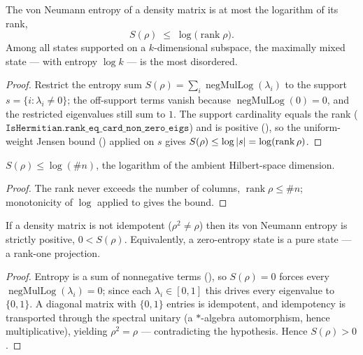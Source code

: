 \begin{theorem}\label{vonNeumannEntropy_le_log_rank}
  \leanok
  The von Neumann entropy of a density matrix is at most the logarithm of its rank,
  \[
    S(\rho) \;\le\; \log\bigl(\operatorname{rank}\rho\bigr).
  \]
  Among all states supported on a \(k\)-dimensional subspace, the maximally mixed state --- with
  entropy \(\log k\) --- is the most disordered.
\end{theorem}
\begin{proof}\leanok
  Restrict the entropy sum \(S(\rho) = \sum_i\operatorname{negMulLog}(\lambda_i)\) to the support
  \(s = \{i : \lambda_i\ne 0\}\); the off-support terms vanish because
  \(\operatorname{negMulLog}(0) = 0\), and the restricted eigenvalues still sum to \(1\). The support
  cardinality equals the rank (\(\texttt{IsHermitian.rank\_eq\_card\_non\_zero\_eigs}\)) and is
  positive (), so the uniform-weight Jensen bound
  () applied on \(s\) gives
  \(S(\rho)\le\log\left\lvert s \right\rvert = \log(\operatorname{rank}\rho)\).
\end{proof}

\begin{corollary}\label{vonNeumannEntropy_le_log_card}
  \leanok
  \(S(\rho)\le\log(\#n)\), the logarithm of the ambient Hilbert-space dimension.
\end{corollary}
\begin{proof}\leanok
  The rank never exceeds the number of columns, \(\operatorname{rank}\rho\le\#n\); monotonicity of
  \(\log\) applied to  gives the bound.
\end{proof}

\begin{theorem}\label{vonNeumannEntropy_pos_of_sq_ne}
  \leanok
  If a density matrix is not idempotent (\(\rho^2\ne\rho\)) then its von Neumann entropy is strictly
  positive, \(0 < S(\rho)\). Equivalently, a zero-entropy state is a pure state --- a rank-one
  projection.
\end{theorem}
\begin{proof}\leanok
  Entropy is a sum of nonnegative terms (), so \(S(\rho) = 0\) forces
  every \(\operatorname{negMulLog}(\lambda_i) = 0\); since each \(\lambda_i\in[0,1]\) this drives
  every eigenvalue to \(\{0,1\}\). A diagonal matrix with \(\{0,1\}\) entries is idempotent, and
  idempotency is transported through the spectral unitary (a \(*\)-algebra automorphism, hence
  multiplicative), yielding \(\rho^2 = \rho\) --- contradicting the hypothesis. Hence \(S(\rho) > 0\).
\end{proof}

